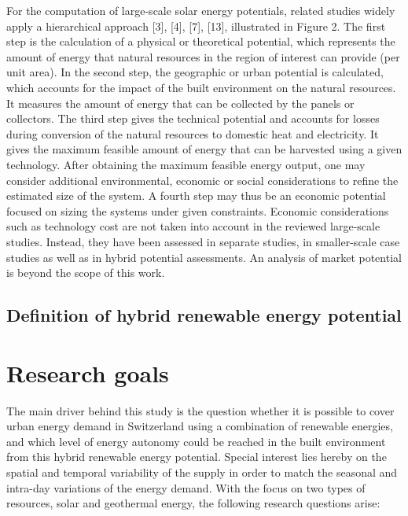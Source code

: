 For the computation of large-scale solar energy potentials, related studies widely apply a hierarchical approach [3], [4], [7], [13], illustrated in Figure 2. The first step is the calculation of a physical or theoretical potential, which represents the amount of energy that natural resources in the region of interest can provide (per unit area). In the second step, the geographic or urban potential is calculated, which accounts for the impact of the built environment on the natural resources. It measures the amount of energy that can be collected by the panels or collectors. The third step gives the technical potential and accounts for losses during conversion of the natural resources to domestic heat and electricity. It gives the maximum feasible amount of energy that can be harvested using a given technology. After obtaining the maximum feasible energy output, one may consider additional environmental, economic or social considerations to refine the estimated size of the system. A fourth step may thus be an economic potential focused on sizing the systems under given constraints. Economic considerations such as technology cost are not taken into account in the reviewed large-scale studies. Instead, they have been assessed in separate studies, in smaller-scale case studies as well as in hybrid potential assessments. An analysis of market potential is beyond the scope of this work. 
 

\subsection{Definition of hybrid renewable energy potential}

\section{Research goals}
\label{intro_goals}
The main driver behind this study is the question whether it is possible to cover urban energy demand in Switzerland using a combination of renewable energies, and which level of energy autonomy could be reached in the built environment from this hybrid renewable energy potential. Special interest lies hereby on the spatial and temporal variability of the supply in order to match the seasonal and intra-day variations of the energy demand. With the focus on two types of resources, solar and geothermal energy, the following research questions arise:

